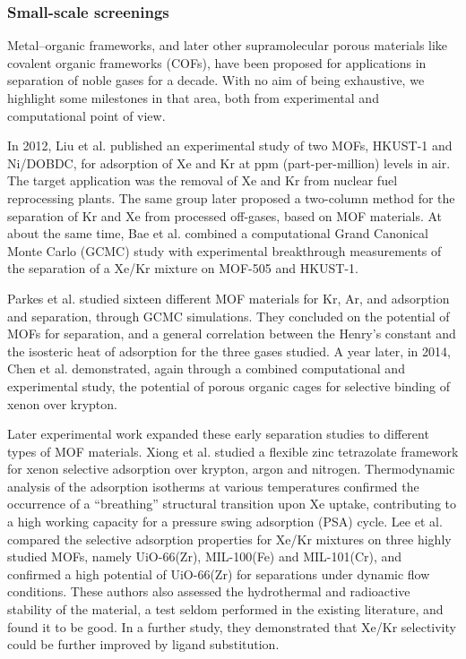 \documentclass[main.tex]{subfiles}
\begin{document}
\subsubsection{Small-scale screenings}

Metal--organic frameworks, and later other supramolecular porous materials like covalent organic frameworks (COFs), have been proposed for applications in separation of noble gases for a decade. With no aim of being exhaustive, we highlight some milestones in that area, both from experimental and computational point of view.

In 2012, Liu et al.\autocite{Liu_2012} published an experimental study of two MOFs, HKUST-1 and Ni/DOBDC, for adsorption of Xe and Kr at ppm (part-per-million) levels in air. The target application was the removal of Xe and Kr from nuclear fuel reprocessing plants. The same group later proposed a two-column method for the separation of Kr and Xe from processed off-gases\autocite{Liu_2014}, based on MOF materials. At about the same time, Bae et al.\autocite{Bae_2013} combined a computational Grand Canonical Monte Carlo (GCMC) study with experimental breakthrough measurements of the separation of a Xe/Kr mixture on MOF-505 and HKUST-1.

Parkes et al.\autocite{Parkes_2013} studied sixteen different MOF materials for Kr, Ar, and  adsorption and separation, through GCMC simulations. They concluded on the potential of MOFs for separation, and a general correlation between the Henry's constant and the isosteric heat of adsorption for the three gases studied. A year later, in 2014, Chen et al.\autocite{Chen_2014} demonstrated, again through a combined computational and experimental study, the potential of porous organic cages for selective binding of xenon over krypton.

Later experimental work expanded these early separation studies to different types of MOF materials. Xiong et al.\autocite{Xiong_2015} studied a flexible zinc tetrazolate framework for xenon selective adsorption over krypton, argon and nitrogen. Thermodynamic analysis of the adsorption isotherms at various temperatures confirmed the occurrence of a ``breathing'' structural transition upon Xe uptake, contributing to a high working capacity for a pressure swing adsorption (PSA) cycle. Lee et al.\autocite{Lee_2016} compared the selective adsorption properties for Xe/Kr mixtures on three highly studied MOFs, namely UiO-66(Zr), MIL-100(Fe) and MIL-101(Cr), and confirmed a high potential of UiO-66(Zr) for separations under dynamic flow conditions. These authors also assessed the hydrothermal and radioactive stability of the material, a test seldom performed in the existing literature, and found it to be good. In a further study,\autocite{Lee_2018} they demonstrated that Xe/Kr selectivity could be further improved by ligand substitution.
\end{document}
